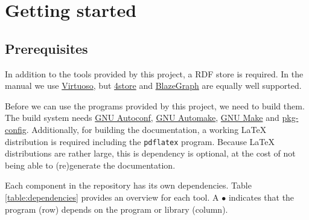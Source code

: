 \chapter{Getting started}

\section{Prerequisites}
\label{sec:prerequisites}

  In addition to the tools provided by this project, a RDF store is required.
  In the manual we use \href{https://virtuoso.openlinksw.com/}{Virtuoso}, but
  \href{https://github.com/4store/4store}{4store} and
  \href{https://www.blazegraph.com/}{BlazeGraph} are equally well supported.

  Before we can use the programs provided by this project, we need to build
  them.  The build system needs
  \href{https://www.gnu.org/software/autoconf}{GNU Autoconf},
  \href{https://www.gnu.org/software/automake}{GNU Automake},
  \href{https://www.gnu.org/software/make}{GNU Make} and
  \href{https://www.freedesktop.org/wiki/Software/pkg-config/}{pkg-config}.
  Additionally, for building the documentation, a working \LaTeX{} distribution is
  required including the \texttt{pdflatex} program.  Because \LaTeX{} distributions
  are rather large, this is dependency is optional, at the cost of not being able
  to (re)generate the documentation.

  Each component in the repository has its own dependencies.  Table
  \ref{table:dependencies} provides an overview for each tool.  A $\bullet{}$
  indicates that the program (row) depends on the program or library (column).

